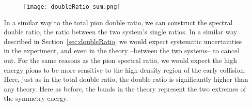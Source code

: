 \begin{figure}[!htb]
\centering
\texttt{[image: doubleRatio\_sum.png]}
\caption{}
\label{fig:spectraDR}
\end{figure}

In a similar way to the total pion double ratio, we can construct the spectral double ratio, the ratio between the two system's single ratios. In a similar way described in Section~\ref{sec:doubleRatio} we would expect systematic uncertainties in the experiment, and even in the theory --between the two systems-- to cancel out. For the same reasons as the pion spectral ratio, we would expect the high energy pions to be more sensitive to the high density region of the early collision. Here, just as in the total double ratio, the double ratio is significantly higher than any theory. Here as before, the bands in the theory represent the two extremes of the symmetry energy. 








